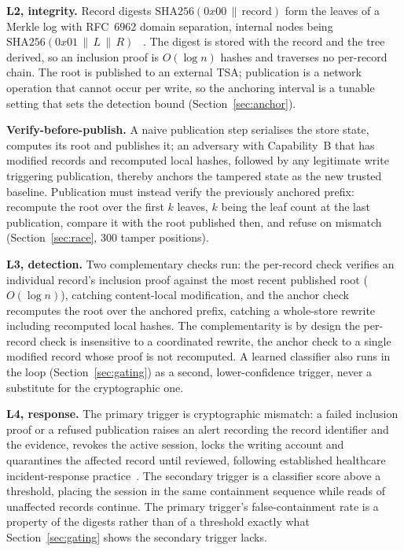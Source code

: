 \documentclass[conference]{IEEEtran}
\begin{document}
\textbf{L2, integrity.} Record digests $\mathrm{SHA256}(0x00 \,\|\, \mathrm{record})$ form the leaves of
a Merkle log with RFC~6962 domain separation, internal nodes being $\mathrm{SHA256}(0x01 \,\|\, L \,\|\, R)$
~\cite{rfc6962}. The digest is stored with the record and the tree derived, so an inclusion proof is
$O(\log n)$ hashes and traverses no per-record chain. The root is published to an external TSA; publication is
a network operation that cannot occur per write, so the anchoring interval is a tunable setting that sets the
detection bound (Section~\ref{sec:anchor}).

\textbf{Verify-before-publish.} A naive publication step serialises the store state, computes its root and
publishes it; an adversary with Capability~B that has modified records and recomputed local hashes, followed by
any legitimate write triggering publication, thereby anchors the tampered state as the new trusted baseline.
Publication must instead verify the previously anchored prefix: recompute the root over the first $k$ leaves,
$k$ being the leaf count at the last publication, compare it with the root published then, and refuse on
mismatch (Section~\ref{sec:race}, 300 tamper positions).

\textbf{L3, detection.} Two complementary checks run: the per-record check verifies an individual record's
inclusion proof against the most recent published root ($O(\log n)$), catching content-local modification, and
the anchor check recomputes the root over the anchored prefix, catching a whole-store rewrite including
recomputed local hashes. The complementarity is by design the per-record check is insensitive to a
coordinated rewrite, the anchor check to a single modified record whose proof is not recomputed. A learned
classifier also runs in the loop (Section~\ref{sec:gating}) as a second, lower-confidence trigger, never a
substitute for the cryptographic one.

\textbf{L4, response.} The primary trigger is cryptographic mismatch: a failed inclusion proof or a
refused publication raises an alert recording the record identifier and the evidence, revokes the active
session, locks the writing account and quarantines the affected record until reviewed, following established
healthcare incident-response practice~\cite{hicp}. The secondary trigger is a classifier
score above a threshold, placing the session in the same containment sequence while reads of unaffected
records continue. The primary trigger's false-containment rate is a property of the digests rather than
of a threshold exactly what Section~\ref{sec:gating} shows the secondary trigger lacks.
\end{document}

